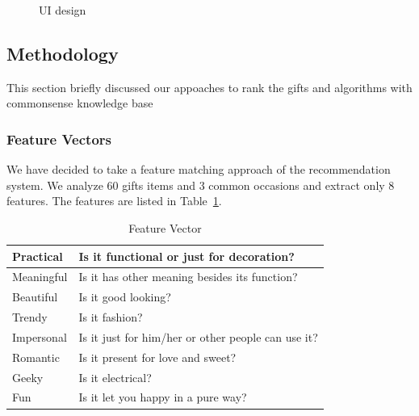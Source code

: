 \documentclass[11pt,twocolumn]{article}
\begin{document}
\begin{figure}[h!t]
\caption{UI design}
\label{ui}
\end{figure}

\subsection{Methodology}

This section briefly discussed our appoaches to rank the gifts and algorithms with commonsense knowledge base

\subsubsection{Feature Vectors}

We have decided to take a feature matching approach of the recommendation system.
We analyze 60 gifts items and 3 common occasions and extract only 8 features.  
The features are listed in Table~\ref{features}.


\begin{table}[ht]
\caption{Feature Vector}
\centering
\begin{tabular}{l l}
\hline
Practical & Is it functional or just for decoration? \\
\hline
Meaningful & Is it has other meaning besides its function? \\
\hline
Beautiful & Is it good looking? \\
\hline
Trendy & Is it fashion? \\
\hline
Impersonal & Is it just for him/her or other people can use it? \\
\hline
Romantic & Is it present for love and sweet? \\
\hline
Geeky & Is it electrical? \\
\hline
Fun & Is it let you happy in a pure way? \\
\end{tabular}
\label{features}
\end{table}
\end{document}
